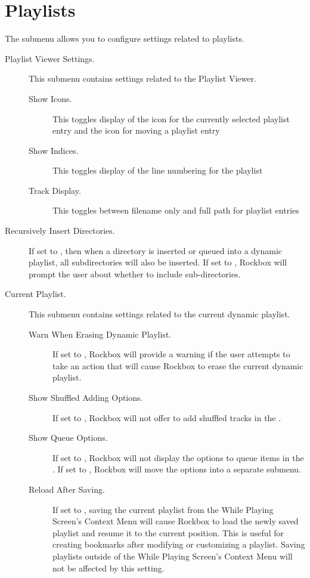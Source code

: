 \section{\label{ref:PlaylistOptions}Playlists}

The  submenu allows you to configure settings
related to playlists.


\begin{description}

\item[Playlist Viewer Settings.]
   This submenu contains settings related to the Playlist Viewer.
   \begin{description}
    \item[Show Icons.] This toggles display of the icon for the currently
    selected playlist entry and the icon for moving a playlist entry
    \item[Show Indices.] This toggles display of the line numbering for
       the playlist
    \item[Track Display.] This toggles between filename only and full path
       for playlist entries
  \end{description}

\item[Recursively Insert Directories.]
  If set to , then when a directory is inserted or queued into a
  dynamic playlist, all subdirectories will also be inserted. If set to ,
  Rockbox will prompt the user about whether to include sub-directories.

\item[Current Playlist.]
  This submenu contains settings related to the current dynamic playlist.
  \begin{description}

  \item[Warn When Erasing Dynamic Playlist.]
  If set to , Rockbox will provide a warning if the user attempts to
  take an action that will cause Rockbox to erase the current dynamic playlist.

  \item[Show Shuffled Adding Options.]
  If set to , Rockbox will not offer to add shuffled tracks
  in the .

  \item[Show Queue Options.]
  If set to , Rockbox will not display the options to queue items in
  the .
  If set to , Rockbox will move the options into a
  separate submenu.

  \item[Reload After Saving.]
  If set to , saving the current playlist from the While Playing Screen's
  Context Menu will cause Rockbox to load the newly saved playlist and resume it to the
  current position. This is useful for creating bookmarks after modifying or customizing
  a playlist. Saving playlists outside of the While Playing Screen's Context Menu will
  not be affected by this setting.

  \end{description}

\end{description}
